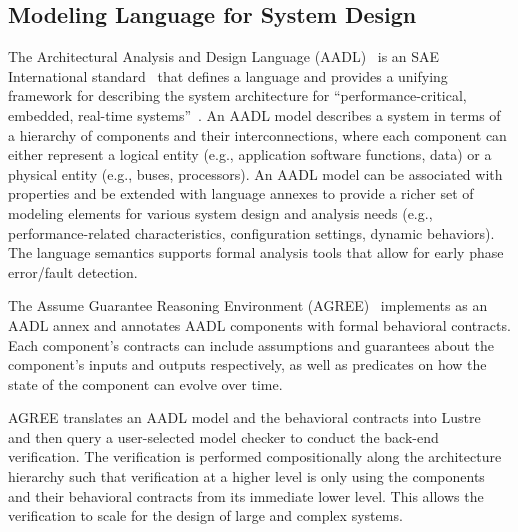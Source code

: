 \subsection{Modeling Language for System Design}
\label{subsec:aadl-agree}
The Architectural Analysis and Design Language (AADL)~\cite{FeilerModelBasedEngineering2012} is an SAE International standard~\cite{AADL_Standard} that defines a language and provides a unifying framework for describing the system architecture for ``performance-critical, embedded, real-time systems''~\cite{AADL_Standard}. An AADL model describes a system in terms of a hierarchy of components and their interconnections, where each component can either represent a logical entity (e.g., application software functions, data) or a physical entity (e.g., buses, processors). An AADL model can be associated with properties and be extended with language annexes to provide a richer set of modeling elements for various system design and analysis needs (e.g., performance-related characteristics, configuration settings, dynamic behaviors). The language semantics supports formal analysis tools that allow for early phase error/fault detection.

The Assume Guarantee Reasoning
Environment (AGREE)~\cite{NFM2012:CoGaMiWhLaLu} implements as an AADL annex and annotates AADL components with formal behavioral contracts. Each component's contracts can include assumptions and guarantees about the component's inputs and outputs respectively, as well as predicates on how the state of the component can evolve over time.

AGREE translates an AADL model and the behavioral contracts into Lustre~\cite{Halbwachs91:IEEE} and then query a user-selected
model checker to conduct the back-end verification. The verification is performed compositionally along the architecture hierarchy such that verification at a higher level is only using the components and their behavioral contracts from its immediate lower level. This allows the verification to scale for the design of large and complex systems. 

\begin{comment}
This paper should define how your team of authors see the interaction between "functions" and "system".  
Here is how I see the interaction / relationship:
(a) Aircraft Functions are the highest level
(b) Aircraft Functions are comprised of one or more System
(c) Each System performs one or more System Function
(d) Each System is comprised of one or more LRUs (a.k.a. "items")
\end{comment}

